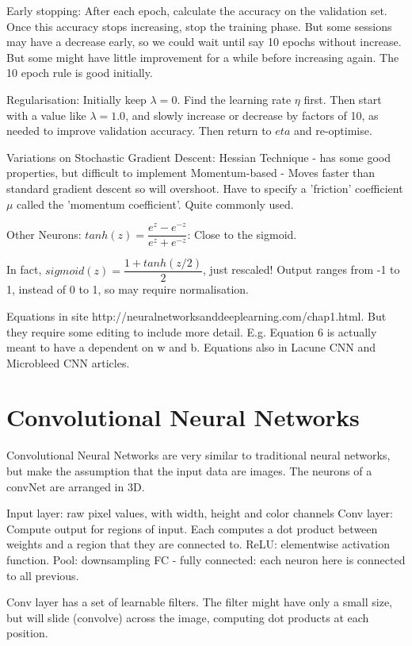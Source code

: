 \documentclass[honours,12pt]{unswthesis}
\numberwithin{equation}{section}
\begin{document}
Early stopping:
After each epoch, calculate the accuracy on the validation set. Once this accuracy stops increasing, stop the training phase. But some sessions may have a decrease early, so we could wait until say 10 epochs without increase. But some might have little improvement for a while before increasing again. The 10 epoch rule is good initially.

Regularisation:
Initially keep $\lambda = 0$. Find the learning rate $\eta$ first. Then start with a value like $\lambda = 1.0$, and slowly increase or decrease by factors of 10, as needed to improve validation accuracy. Then return to $eta$ and re-optimise.

Variations on Stochastic Gradient Descent:
Hessian Technique - has some good properties, but difficult to implement
Momentum-based - Moves faster than standard gradient descent so will overshoot. Have to specify a 'friction' coefficient $\mu$ called the 'momentum coefficient'. Quite commonly used.

Other Neurons:
$tanh(z) = \dfrac{e^z - e^{-z}}{e^z + e^{-z}}$: Close to the sigmoid.

In fact, $sigmoid(z) = \dfrac{1 + tanh(z/2)}{2}$, just rescaled! Output ranges from -1 to 1, instead of 0 to 1, so may require normalisation.

Equations in site http://neuralnetworksanddeeplearning.com/chap1.html. But they require some editing to include more detail. E.g. Equation 6 is actually meant to have a dependent on w and b.
Equations also in Lacune CNN and Microbleed CNN articles.

\section{Convolutional Neural Networks}\label{convNeuralNets}

Convolutional Neural Networks are very similar to traditional neural networks, but make the assumption that the input data are images.
The neurons of a convNet are arranged in 3D. 

Input layer: raw pixel values, with width, height and color channels
Conv layer: Compute output for regions of input. Each computes a dot product between weights and a region that they are connected to.
ReLU: elementwise activation function.
Pool: downsampling
FC - fully connected: each neuron here is connected to all previous.

Conv layer has a set of learnable filters. The filter might have only a small size, but will slide (convolve) across the image, computing dot products at each position.
\end{document}
